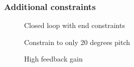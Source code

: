 \documentclass[11pt, a4paper, USenglish]{article} %
\begin{document}
\subsubsection{Additional constraints}
\begin{figure}[H] 
        \centering
        \setlength{\figureheight}{6cm}
        \setlength{\figurewidth}{10cm}
        \caption{Closed loop with end constraints} 
\label{fig:ex4_6_only_end_contstrains} 
\end{figure}

\begin{figure}[H] 
        \centering
        \setlength{\figureheight}{6cm}
        \setlength{\figurewidth}{10cm}
        
        \caption{Constrain to only 20 degrees pitch} 
\label{fig:ex4_6_all_constraints} 
\end{figure}

\begin{figure}[H] 
        \centering
        \setlength{\figureheight}{6cm}
        \setlength{\figurewidth}{10cm}
        
        \caption{High feedback gain} 
\label{fig:ex4_6_high_feedbackgain} 
\end{figure}






\end{document}
